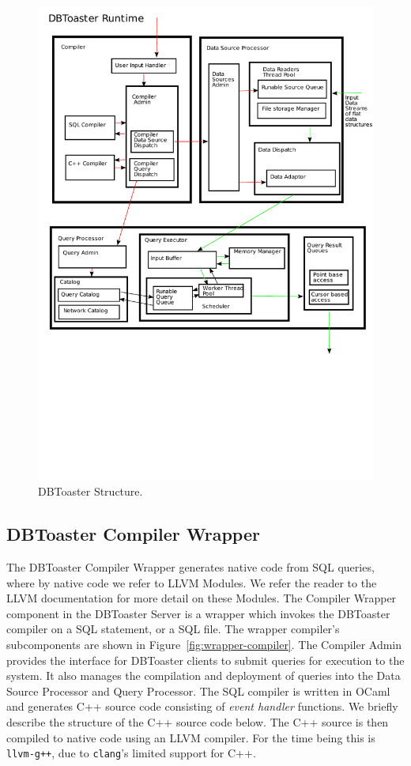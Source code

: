 \documentclass[14pt]{article}
\begin{document}
\begin{figure}
  \includegraphics[width=4.50in]{figures/DBToasterRuntime.pdf}
  \caption{DBToaster Structure.}
  \label{fig:dbt-runtime}
\end{figure}



\subsection{DBToaster Compiler Wrapper}

The DBToaster Compiler Wrapper generates native code from SQL queries, where by
native code we refer to LLVM Modules. We refer the reader to the LLVM
documentation \cite{url-llvm} for more detail on these Modules. The Compiler
Wrapper component in the DBToaster Server is a wrapper which invokes the
DBToaster compiler on a SQL statement, or a SQL file.  The wrapper compiler's
subcomponents are shown in Figure~\ref{fig:wrapper-compiler}.  The Compiler
Admin provides the interface for DBToaster clients to submit queries for
execution to the system. It also manages the compilation and deployment of
queries into the Data Source Processor and Query Processor.  The SQL compiler is
written in OCaml and generates C++ source code consisting of \textit{event
handler} functions. We briefly describe the structure of the C++ source code
below. The C++ source is then compiled to native code using an LLVM
compiler. For the time being this is \texttt{llvm-g++}, due to \texttt{clang}'s
\cite{url-clang} limited support for C++.
\end{document}
